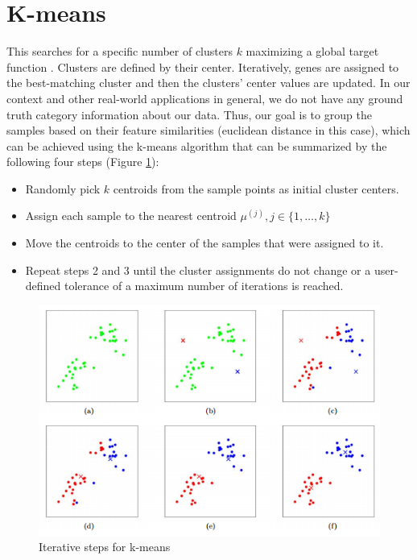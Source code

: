 \section{K-means} \label{3.3}
This searches for a specific number of clusters $k$ maximizing a global target function \cite{Bishop2013}. Clusters are defined by their center. Iteratively, genes are assigned to the best-matching cluster and then the clusters' center values are updated. In our context and other real-world applications in general, we do not have any ground truth category information about our data. Thus, our goal is to group the samples based on their feature similarities (euclidean distance in this case), which can be achieved using the k-means algorithm that can be summarized by the following four steps (Figure \ref{fig: kmeans}):
\begin{itemize}
	\item Randomly pick $k$ centroids from the sample points as initial cluster centers.
	\item Assign each sample to the nearest centroid $\mu^{(j)}, j \in \{1,\dots,k\}$
	\item Move the centroids to the center of the samples that were assigned to it.
	\item Repeat steps 2 and 3 until the cluster assignments do not change or a user-defined tolerance of a maximum number of iterations is reached.
\end{itemize}

\begin{figure}[h] 
	\centering
	\includegraphics[scale = 0.8]{Figures/kmeans.png}
	\caption{Iterative steps for k-means}
	\label{fig: kmeans}
\end{figure}

